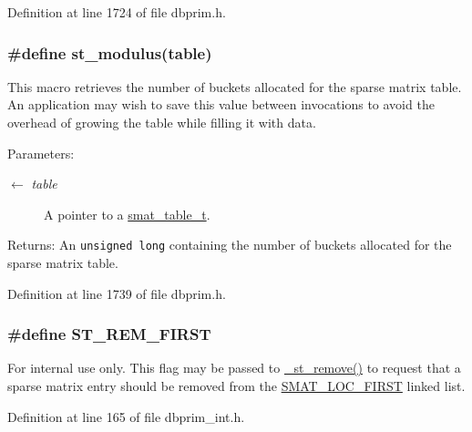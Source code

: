 Definition at line 1724 of file dbprim.h.\hypertarget{group__dbprim__smat_ga37}{
\subsubsection[st\_\-modulus]{\setlength{\rightskip}{0pt plus 5cm}\#define st\_\-modulus(table)}}
\label{group__dbprim__smat_ga37}


This macro retrieves the number of buckets allocated for the sparse matrix table. An application may wish to save this value between invocations to avoid the overhead of growing the table while filling it with data.

\begin{Desc}
\item[Parameters:]
\begin{description}
\item[\mbox{$\leftarrow$} {\em table}]A pointer to a \hyperlink{group__dbprim__smat_ga0}{smat\_\-table\_\-t}.\end{description}
\end{Desc}
\begin{Desc}
\item[Returns:]An {\tt unsigned long} containing the number of buckets allocated for the sparse matrix table.\end{Desc}


Definition at line 1739 of file dbprim.h.\hypertarget{group__dbprim__smat_ga66}{
\subsubsection[ST\_\-REM\_\-FIRST]{\setlength{\rightskip}{0pt plus 5cm}\#define ST\_\-REM\_\-FIRST}}
\label{group__dbprim__smat_ga66}


\begin{Desc}
\item[For internal use only.]
This flag may be passed to \hyperlink{group__dbprim__smat_ga23}{\_\-st\_\-remove()} to request that a sparse matrix entry should be removed from the \hyperlink{group__dbprim__smat_gga70a137}{SMAT\_\-LOC\_\-FIRST} linked list.\end{Desc}


Definition at line 165 of file dbprim\_\-int.h.


